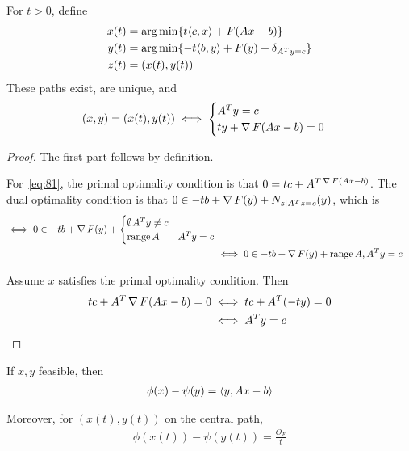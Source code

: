 
\begin{proposition}
  For $t > 0$, define
  \begin{align}
    \label{eq:80}
    x(t) &= \argmin \{ t \IP{c, x} + F(Ax - b) \} \\
    y(t) &= \argmin \{ -t \IP{b, y} + F(y) + \delta_{A^{T} y = c} \} \\
    z(t) &= (x(t), y(t))
  \end{align}
  These paths exist, are unique, and
  \begin{align}
    \label{eq:81}
    (x, y) = (x(t), y(t)) \iff
    \begin{cases}
      A^{T} y = c \\
      ty + \operatorname*{\nabla} F(Ax - b) = 0
    \end{cases}
  \end{align}
\end{proposition}

\begin{proof}
  The first part follows by definition.

  For~\eqref{eq:81}, the primal optimality condition is that $0 = tc +
  A^{T \operatorname*{\nabla} F(Ax - b)}$. The dual optimality condition is that $0 \in
  -tb + \operatorname*{\nabla} F(y) + N_{z | A^{T}z = c}(y)$, which is
  \begin{align}
    \label{eq:82}
    \iff 0 \in -tb + \operatorname*{\nabla} F(y) +
    \begin{cases}
      \emptyset ^{} A^{T} y \neq c \\
      \operatorname*{range} A & A^{T} y = c
    \end{cases} \\
    &\iff 0 \in -tb + \operatorname*{\nabla} F(y) + \operatorname*{range} A, A^{T} y = c
  \end{align}

  Assume $x$ satisfies the primal optimality condition. Then
  \begin{align}
    \label{eq:83}
    tc + A^{T} \operatorname*{\nabla} F(Ax - b) = 0 &\iff tc + A^{T}(-ty) = 0 \\
    &\iff A^{T}y = c
  \end{align}
\end{proof}

\begin{proposition}
  If $x, y$ feasible, then
  \begin{align}
    \label{eq:84}
    \phi(x) - \psi(y) = \IP{y, Ax - b}
  \end{align}

  Moreover, for $(x(t), y(t))$ on the central path,
  \begin{align}
    \label{eq:85}
    \phi(x(t)) - \psi(y(t)) = \frac{\Theta_{F}}{t}
  \end{align}
\end{proposition}

